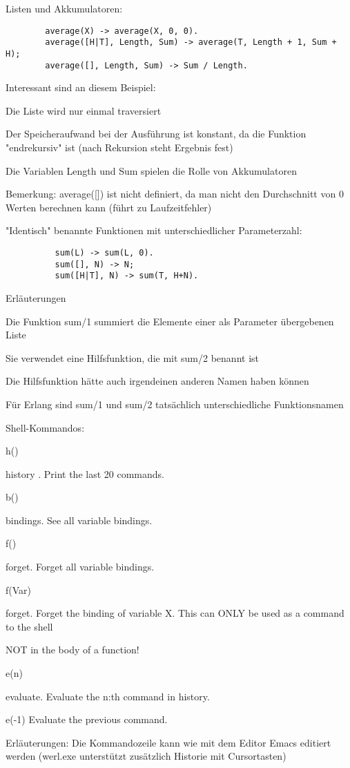 \documentclass[10pt]{article}
\begin{document}
Listen und Akkumulatoren:
\begin{lstlisting}
        average(X) -> average(X, 0, 0).
        average([H|T], Length, Sum) -> average(T, Length + 1, Sum + H);
        average([], Length, Sum) -> Sum / Length.
\end{lstlisting}
\begin{itemize*}
  \item Interessant sind an diesem Beispiel:
  \item Die Liste wird nur einmal traversiert
  \item Der Speicheraufwand bei der Ausführung ist konstant, da die Funktion "endrekursiv" ist (nach Rekursion steht Ergebnis fest)
  \item Die Variablen Length und Sum spielen die Rolle von Akkumulatoren
  \item Bemerkung: average([]) ist nicht definiert, da man nicht den Durchschnitt von 0 Werten berechnen kann (führt zu Laufzeitfehler)
\end{itemize*}

"Identisch" benannte Funktionen mit unterschiedlicher Parameterzahl:
\begin{lstlisting}
          sum(L) -> sum(L, 0).
          sum([], N) -> N;
          sum([H|T], N) -> sum(T, H+N).
          \end{lstlisting}
\begin{itemize*}
  \item Erläuterungen
  \item Die Funktion sum/1 summiert die Elemente einer als Parameter übergebenen Liste
  \item Sie verwendet eine Hilfsfunktion, die mit sum/2 benannt ist
  \item Die Hilfsfunktion hätte auch irgendeinen anderen Namen haben können
  \item Für Erlang sind sum/1 und sum/2 tatsächlich unterschiedliche Funktionsnamen
\end{itemize*}

Shell-Kommandos:
\begin{itemize*}
  \item h() \item history . Print the last 20 commands.
  \item b() \item bindings. See all variable bindings.
  \item f() \item forget. Forget all variable bindings.
  \item f(Var) \item forget. Forget the binding of variable X. This can ONLY be used as a command to the shell \item NOT in the body of a function!
  \item e(n) \item evaluate. Evaluate the n:th command in history.
  \item e(-1) Evaluate the previous command.
  \item Erläuterungen: Die Kommandozeile kann wie mit dem Editor Emacs editiert werden (werl.exe unterstützt zusätzlich Historie mit Cursortasten)
\end{itemize*}
\end{document}
